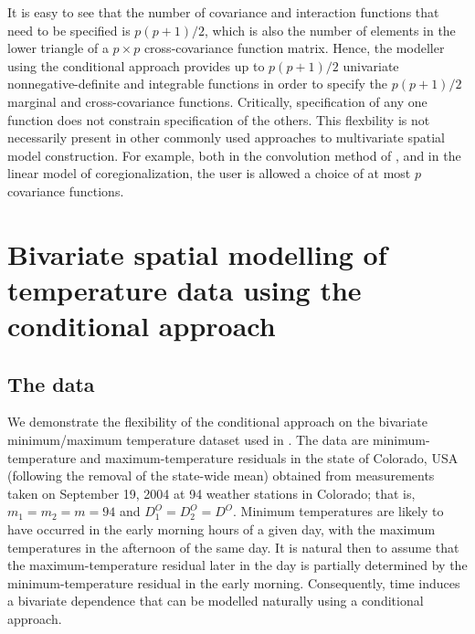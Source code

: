 \documentclass[lineno]{biometrika}
\begin{document}
It is easy to see that the number of covariance and interaction functions that need to be specified is $p(p+1)/2$, which is also the number of elements in the lower triangle of a $p \times p$ cross-covariance function matrix. Hence, the modeller using the conditional approach provides up to $p(p+1)/2$ univariate nonnegative-definite and integrable functions in order to specify the $p(p+1)/2$ marginal and cross-covariance functions. Critically, specification of any one function does not constrain specification of the others. This flexbility is not necessarily present in other commonly used approaches to multivariate spatial model construction. For example, both in the convolution method of \citet{MajumdarGelfand2007}, and in the linear model of coregionalization, the user is allowed a choice of at most $p$ covariance functions. 




\section{Bivariate spatial modelling of temperature data using the conditional approach}\label{sec:5}

\subsection{The data}

We demonstrate the flexibility of the conditional approach on the bivariate minimum/maximum temperature dataset used in \cite{GentonKleiber2015}. The data are minimum-temperature and maximum-temperature residuals in the state of Colorado, USA (following the removal of the state-wide mean) obtained from measurements taken on September 19, 2004 at 94 weather stations in Colorado; that is, $m_1 = m_2 = m = 94$ and $D_1^O = D_2^O = D^O$. Minimum temperatures are likely to have occurred in the early morning hours of a given day, with the maximum temperatures in the afternoon of the same day. It is natural then to assume that the maximum-temperature residual later in the day is partially determined by the minimum-temperature residual in the early morning. Consequently, time induces a bivariate dependence that can be modelled naturally using a conditional approach.  %

\end{document}
